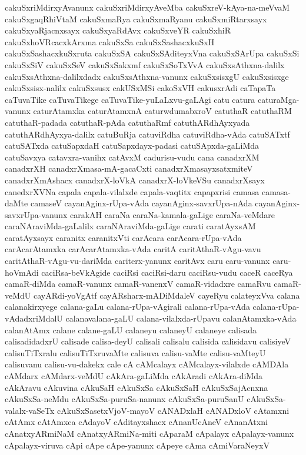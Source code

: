 {cakuSxriMdirxyAvanunx
cakuSxriMdirxyAveMba
cakuSxreV-kAya-na-meVvaM
cakuSxgaqRhiVtaM
cakuSxmaRya
cakuSxmaRyanu
cakuSxmiRtarxsayx
cakuSxyaRjacnxsayx
cakuSxyaRdAvx
cakuSxveYR
cakuSxhiR
cakuSxhoVRcacxkArxma
cakuSxSa
cakuSxSashacxkuSxH
cakuSxSashacxkuSxruta
cakuSxSA
cakuSxSAditeyxVna
cakuSxSArUpa
cakuSxSi
cakuSxSiV
cakuSxSeV
cakuSxSakxmf
cakuSxSoTxVvA
cakuSxsAthxna-dalilx
cakuSxsAthxna-dalilxdadx
cakuSxsAthxna-vanunx
cakuSxsisxgU
cakuSxsisxge
cakuSxsisx-nalilx
cakuSxsusx
cakUSxMSi
cakoSxVH
cakusxrAdi
caTapaTa
caTuvaTike
caTuvaTikege
caTuvaTike-yuLaLxvu-gaLAgi
catu
catura
caturaMga-vanunx
caturAtamxka
caturAtamxnA
caturwdumabxroV
catuthaR
catuthaRM
catuthaR-padada
catuthaR-pAda
catuthaRmf
catuthARdhAyxyada
catuthARdhAyxya-dalilx
catuBuRja
catuviRdha
catuviRdha-vAda
catuSATxtf
catuSATxda
catuSapxdaH
catuSapxdayx-padasi
catuSApxda-gaLiMda
catuSavxya
catavxra-vanihx
catAvxM
cadurisu-vudu
cana
canadxrXM
canadxrXH
canadxrXmasa-mA-gacaCxti
canadxrXmasayxsatxmiteV
canadxrXmAshacx
canadxrX-loVkA
canadxrX-loVkeVSu
canadxrXsayx
canedxrXVNa
capala
capala-vilalxde
capala-vaqtitx
capapxrisi
camasa
camasa-daMte
camaseV
cayanAginx-rUpa-vAda
cayanAginx-savxrUpa-nAda
cayanAginx-savxrUpa-vanunx
carakAH
caraNa
caraNa-kamala-gaLige
caraNa-veMdare
caraNAraviMda-gaLalilx
caraNAraviMda-gaLige
carati
caratAyxsAM
caratAyxsayx
caranitx
caranitxVti
carAcara
carAcara-rUpa-vAda
carAcarAtamxka
carAcarAtamxka-vAda
caritA
caritAthaR-vAgu-vavu
caritAthaR-vAgu-vu-dariMda
cariterx-yanunx
caritAvx
caru
caru-vanunx
caru-hoVmAdi
caciRsa-beVkAgide
caciRsi
caciRsi-daru
caciRsu-vudu
caceR
caceRya
camaR-diMda
camaR-vanunx
camaR-vanenxV
camaR-vidadxre
camaRvu
camaR-veMdU
cayARdi-yoVgAtf
cayARsharx-mADiMdaleV
cayeRyu
calateyxVva
calana
calanakirxyege
calana-gaLu
calana-rUpa-vAgirali
calana-rUpa-vAda
calana-rUpa-vAdadxriMdalU
calanavalana-gaLU
calana-vilalxda-rUpavu
calanAtamxka-vAda
calanAtAmx
calane
calane-gaLU
calaneyu
calaneyU
calaneye
calisada
calisadidadxrU
calisade
calisa-deyU
calisali
calisalu
calisida
calisidavu
calisiyeV
calisuTiTxralu
calisuTiTxruvaMte
calisuva
calisu-vaMte
calisu-vaMteyU
calisuvanu
calisu-vu-dakekx
cale
cA
cAMcalayx
cAMcalayx-vilalxde
cAMDAla
cAMdarx
cAMdarx-veMdU
cAkAra-gaLiMda
cAkAradi
cAkAra-diMda
cAkAravu
cAkuvina
cAkuSaH
cAkuSxSa
cAkuSxSaH
cAkuSxSajAcnxna
cAkuSxSa-neMdu
cAkuSxSa-puruSa-nanunx
cAkuSxSa-puruSanU
cAkuSxSa-valalx-vaSeTx
cAkuSxSasetxVjoV-mayoV
cANADxlaH
cANADxloV
cAtamxni
cAtAmx
cAtAmxca
cAdayoV
cAditayxshacx
cAnanUcAneV
cAnanAtxni
cAnatxyARmiNaM
cAnatxyARmiNa-miti
cAparaM
cApalayx
cApalayx-vanunx
cApalayx-viruva
cApi
cApe
cApe-yanunx
cApeye
cAma
cAmiVaraNeyxV
}
